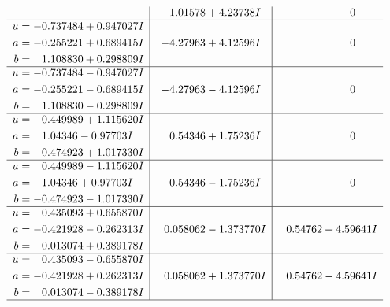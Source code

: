 \documentclass[1p]{elsarticle_modified}
\theoremstyle{definition}
\begin{document}
$$\begin{array}{c|c|c}
 & \phantom{-}1.01578 + 4.23738 I & \phantom{-0.000000 } 0 \\ \hline\begin{aligned}
u &= -0.737484 + 0.947027 I \\
a &= -0.255221 + 0.689415 I \\
b &= \phantom{-}1.108830 + 0.298809 I\end{aligned}
 & -4.27963 + 4.12596 I & \phantom{-0.000000 } 0 \\ \hline\begin{aligned}
u &= -0.737484 - 0.947027 I \\
a &= -0.255221 - 0.689415 I \\
b &= \phantom{-}1.108830 - 0.298809 I\end{aligned}
 & -4.27963 - 4.12596 I & \phantom{-0.000000 } 0 \\ \hline\begin{aligned}
u &= \phantom{-}0.449989 + 1.115620 I \\
a &= \phantom{-}1.04346 - 0.97703 I \\
b &= -0.474923 + 1.017330 I\end{aligned}
 & \phantom{-}0.54346 + 1.75236 I & \phantom{-0.000000 } 0 \\ \hline\begin{aligned}
u &= \phantom{-}0.449989 - 1.115620 I \\
a &= \phantom{-}1.04346 + 0.97703 I \\
b &= -0.474923 - 1.017330 I\end{aligned}
 & \phantom{-}0.54346 - 1.75236 I & \phantom{-0.000000 } 0 \\ \hline\begin{aligned}
u &= \phantom{-}0.435093 + 0.655870 I \\
a &= -0.421928 - 0.262313 I \\
b &= \phantom{-}0.013074 + 0.389178 I\end{aligned}
 & \phantom{-}0.058062 - 1.373770 I & \phantom{-}0.54762 + 4.59641 I \\ \hline\begin{aligned}
u &= \phantom{-}0.435093 - 0.655870 I \\
a &= -0.421928 + 0.262313 I \\
b &= \phantom{-}0.013074 - 0.389178 I\end{aligned}
 & \phantom{-}0.058062 + 1.373770 I & \phantom{-}0.54762 - 4.59641 I\\
 \hline 
 \end{array}$$\newpage$$\begin{array}{c|c|c}  

\end{array}$$
\end{document}
